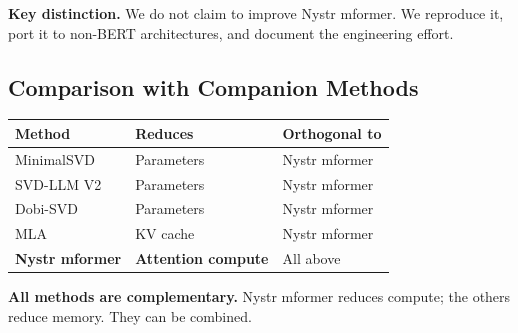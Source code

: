 \textbf{Key distinction.} We do not claim to improve Nystr mformer. We reproduce 
it, port it to non-BERT architectures, and document the engineering effort.

\subsection{Comparison with Companion Methods}

\begin{table}[H]
\centering
\small
\begin{tabular}{lll}
\toprule
\textbf{Method} & \textbf{Reduces} & \textbf{Orthogonal to} \\
\midrule
MinimalSVD & Parameters & Nystr mformer \\
SVD-LLM V2 & Parameters & Nystr mformer \\
Dobi-SVD & Parameters & Nystr mformer \\
MLA & KV cache & Nystr mformer \\
\textbf{Nystr mformer} & \textbf{Attention compute} & All above \\
\bottomrule
\end{tabular}
\end{table}

\textbf{All methods are complementary.} Nystr mformer reduces compute; the others 
reduce memory. They can be combined.

